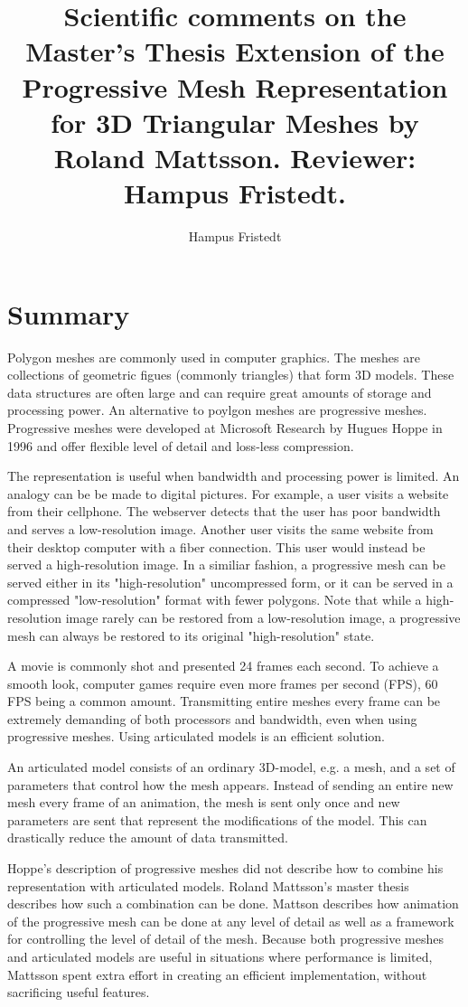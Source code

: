 \documentclass{article}
\title{Scientific comments on the Master's Thesis Extension of the Progressive Mesh Representation for 3D Triangular Meshes by Roland Mattsson. Reviewer:
Hampus Fristedt.}
\author{Hampus Fristedt}
\begin{document}
\maketitle

\newpage

\section{Summary}

Polygon meshes are commonly used in computer graphics. The meshes are
collections of geometric figues (commonly triangles) that form 3D models. These
data structures are often large and can require great amounts of storage and
processing power. An alternative to poylgon meshes are progressive meshes.
Progressive meshes were developed at Microsoft Research by Hugues Hoppe in 1996
and offer flexible level of detail and loss-less compression. 

The representation is useful when bandwidth and processing power is limited. An
analogy can be be made to digital pictures. For example, a user visits a website
from their cellphone. The webserver detects that the user has poor bandwidth and
serves a low-resolution image. Another user visits the same website from their
desktop computer with a fiber connection. This user would instead be served a
high-resolution image. In a similiar fashion, a progressive mesh can be served
either in its "high-resolution" uncompressed form, or it can be served in a
compressed "low-resolution" format with fewer polygons. Note that while a
high-resolution image rarely can be restored from a low-resolution image, a
progressive mesh can always be restored to its original "high-resolution" state.

A movie is commonly shot and presented 24 frames each second. To achieve a
smooth look, computer games require even more frames per second (FPS), 60 FPS
being a common amount. Transmitting entire meshes every frame can be extremely
demanding of both processors and bandwidth, even when using progressive meshes.
Using articulated models is an efficient solution.

An articulated model consists of an ordinary 3D-model, e.g. a mesh, and a set of
parameters that control how the mesh appears. Instead of sending an entire new
mesh every frame of an animation, the mesh is sent only once and new parameters
are sent that represent the modifications of the model. This can drastically
reduce the amount of data transmitted.

Hoppe's description of progressive meshes did not describe how to combine his
representation with articulated models. Roland Mattsson's master thesis
describes how such a combination can be done. Mattson describes how animation of
the progressive mesh can be done at any level of detail as well as a framework
for controlling the level of detail of the mesh. Because both progressive meshes
and articulated models are useful in situations where performance is limited,
Mattsson spent extra effort in creating an efficient implementation, without
sacrificing useful features.
\end{document}
